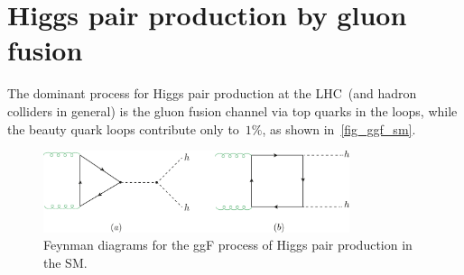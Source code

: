 \section{Higgs pair production by gluon fusion \label{ggFhh}  }
The dominant process for Higgs pair production at the LHC~(and hadron colliders in general) is the gluon fusion channel via top quarks in the loops, while the beauty quark loops contribute only to~$1\%$, as shown in~\autoref{fig_ggf_sm}.
%
\begin{figure}[!htpb]
	\centering
	\includegraphics[width = 0.8\textwidth]{./figures/di-higgs-LO-SM}
	\caption{Feynman diagrams for the ggF process of Higgs pair production in the SM.} 
	\label{fig_ggf_sm}
\end{figure}
%
